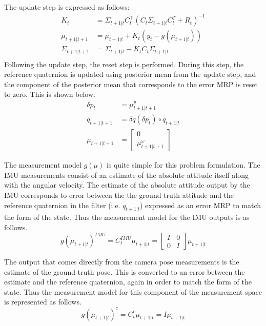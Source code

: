 \documentclass[conference]{IEEEtran}
\begin{document}
The update step is expressed as follows:
%
\begin{align*}
    K_t & =  \Sigma_{t+1|t} C_t^\top (C_t \Sigma_{t+1|t} C_t^T + R_t)^{-1} \\
    \mu_{t+1|t+1}
     & = 
    \mu_{t+1|t} + K_t \left(y_t - g\left(\mu_{t+1|t} \right) \right) 
     \\
     \Sigma_{t+1|t+1} & = \Sigma_{t+1|t} - K_t C_t  \Sigma_{t+1|t}  \\
\end{align*}
Following the update step, the reset step is performed. 
During this step, the reference quaternion is updated using posterior mean from the update step, and the component of the posterior mean that corresponds to the error MRP is reset to zero. 
This is shown below.
\begin{align*}
    \delta p_{t} & = \mu_{t+1|t+1}^{p}\\
    q_{t+1|t+1} & = \delta q(\delta p_{t}) \circ q_{t+1|t} \\
    \mu_{t+1|t+1} & = \begin{bmatrix} 0 \\
    \mu_{t+1|t+1}^{\omega}\end{bmatrix}
\end{align*}

The measurement model $g(\mu)$ is quite simple for this problem formulation. 
The IMU measurements consist of an estimate of the absolute attitude itself along with the angular velocity. 
The estimate of the absolute attitude output by the IMU corresponds to error between the the ground truth attitude and the reference quaternion in the filter (i.e. $q_{t+1|t}$) expressed as an error MRP to match the form of the state. 
Thus the measurement model for the IMU outputs is as follows.
\begin{equation*}
    g(\mu_{t+1|t})^{IMU} = C_t^{IMU} \mu_{t+1|t} = \begin{bmatrix}
        I & 0 \\
        0 & I
    \end{bmatrix} \mu_{t+1|t}
\end{equation*}

The output that comes directly from the camera pose measurements is the estimate of the ground truth pose. 
This is converted to an error between the estimate and the reference quaternion, again in order to match the form of the state. 
Thus the measurement model for this component of the measurement space is represented as follows.
\begin{equation*}
    g(\mu_{t+1|t})^{c} = C_t^c \mu_{t+1|t} = I \mu_{t+1|t}
\end{equation*}
\end{document}
